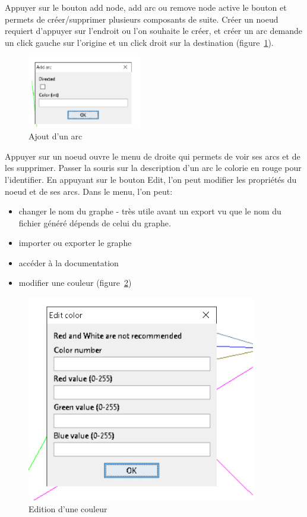 \documentclass[pidr]{tnreport}
\begin{document}
Appuyer sur le bouton add node, add arc ou remove node active le bouton et permets de créer/supprimer plusieurs composants de suite. Créer un noeud requiert d’appuyer sur l’endroit ou l’on souhaite le créer, et créer un arc demande un click gauche sur l’origine et un click droit sur la destination (figure~\ref{fig:add_arc}).

\begin{figure}[h]
  \centering
  \includegraphics[width=5cm]{figures/exemples/add_arc}
  \caption{Ajout d'un arc}
  \label{fig:add_arc}
\end{figure}

Appuyer sur un noeud ouvre le menu de droite qui permets de voir ses arcs et de les supprimer. Passer la souris sur la description d’un arc le colorie en rouge pour l’identifier. En appuyant sur le bouton Edit, l’on peut modifier les propriétés du noeud et de ses arcs.
Dans le menu, l’on peut: 

\begin{itemize}
\item changer le nom du graphe - très utile avant un export vu que le nom du fichier généré dépends de celui du graphe.
\item importer ou exporter le graphe
\item accéder à la documentation
\item modifier une couleur (figure~\ref{fig:edit_color})
\end{itemize}


\begin{figure}[h]
  \centering
  \includegraphics[width=10cm]{figures/exemples/edit_color}
  \caption{Edition d'une couleur}
  \label{fig:edit_color}
\end{figure}
\end{document}
